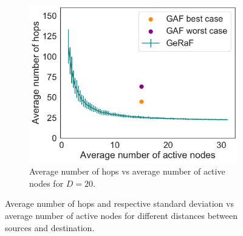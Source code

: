 \documentclass[twoside,onecolumn]{article}
\theoremstyle{definition}
\begin{document}
\begin{figure}
          \begin{subfigure}{0.5\textwidth}
         \includegraphics[width=\textwidth]{../multihop_GeRaF/figures/multihop_GeRaF_N100_distance20.pdf}
         \caption{Average number of hops vs average number of active nodes for $D=20$.}\label{fig:gaf20}
     \end{subfigure}
     
  \caption{Average number of hops and respective standard deviation vs average number of active nodes for different distances between sources and destination.}\label{fig:gaf}
\end{figure}



\end{document}

